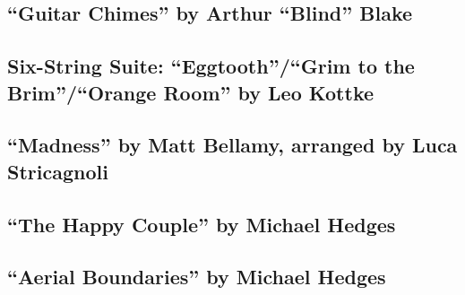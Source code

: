 \message{ !name(carlsonProgramNotes.tex)}\documentclass{article}
\begin{document}
\subsection*{``Guitar Chimes'' by Arthur ``Blind'' Blake}

\subsection*{Six-String Suite: ``Eggtooth''/``Grim to the Brim''/``Orange Room'' by Leo Kottke}

\subsection*{``Madness'' by Matt Bellamy, arranged by Luca Stricagnoli}

\subsection*{``The Happy Couple'' by Michael Hedges}

\subsection*{``Aerial Boundaries'' by Michael Hedges}


 
\end{document}
